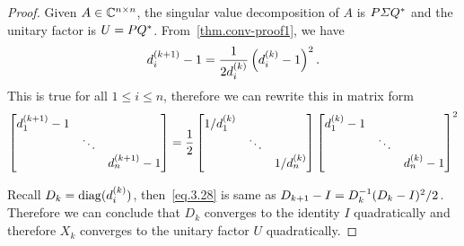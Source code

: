 \begin{proof}
    Given $A\in\mathbb{C}^{n\times n}$, the singular value decomposition of $A$ is $P\varSigma Q^*$ and the unitary factor is $U = PQ^*$. From~\eqref{thm.conv-proof1}, we have 
    \begin{equation}\notag
        d_i^{(k+1)} - 1 = \frac{1}{2d_i^{(k)}}\left(d_i^{(k)}-1\right)^2.
    \end{equation}
    This is true for all $1\leq i\leq n$, therefore we can rewrite this in matrix form
    \begin{equation}\label{eq.3.28}
        \begin{bmatrix}
            d_1^{(k+1)}-1 & & \\
            & \ddots & \\
            & & d_n^{(k+1)}-1
        \end{bmatrix} = 
        \frac{1}{2}
        \begin{bmatrix}
            1/d_1^{(k)} & & \\
            & \ddots & \\
            & & 1/d_n^{(k)}
        \end{bmatrix}
        \begin{bmatrix}
            d_1^{(k)}-1 & & \\
            & \ddots & \\
            & & d_n^{(k)}-1
        \end{bmatrix}^2
    \end{equation}

    Recall $D_k = \mathrm{diag}(d_i^{(k)})$, then~\eqref{eq.3.28} is same as $D_{k+1}-I = D_k^{-1} (D_k - I)^2/2$. Therefore we can conclude that $D_{k}$ converges to the identity $I$ quadratically and therefore $X_{k}$ converges to the unitary factor $U$ quadratically.


\end{proof}
